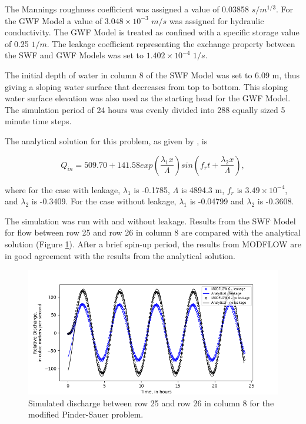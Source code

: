 \documentclass[fleqn]{article}
\begin{document}
The Mannings roughness coefficient was assigned a value of 0.03858 $s/m^{1/3}$.  For the GWF Model a value of $3.048 \times 10^{-3}$ $m/s$ was assigned for hydraulic conductivity. The GWF Model is treated as confined with a specific storage value of 0.25 $1/m$.  The leakage coefficient representing the exchange property between the SWF and GWF Models was set to $1.402 \times 10^{-4}$ $1/s$.

The initial depth of water in column 8 of the SWF Model was set to 6.09 m, thus giving a sloping water surface that decreases from top to bottom.  This sloping water surface elevation was also used as the starting head for the GWF Model.  The simulation period of 24 hours was evenly divided into 288 equally sized 5 minute time steps.  

The analytical solution for this problem, as given by \cite{lal2001}, is

\begin{equation}
  Q_{in} = 509.70 + 141.58 
  exp \left ( \frac{\lambda_1 x}{\Lambda} \right ) 
  sin \left ( f_r t + \frac{\lambda_2 x}{\Lambda}\right ),
\end{equation}

\noindent where for the case with leakage, $\lambda_1$ is -0.1785, $\Lambda$ is 4894.3 m, $f_r$ is $3.49 \times 10^{-4}$, and $\lambda_2$ is -0.3409.  For the case without leakage, $\lambda_1$ is -0.04799 and $\lambda_2$ is -0.3608.

The simulation was run with and without leakage.  Results from the SWF Model for flow between row 25 and row 26 in column 8 are compared with the analytical solution (Figure \ref{fig:pinder-sauer}). After a brief spin-up period, the results from MODFLOW are in good agreement with the results from the analytical solution.

\begin{figure}
	\centering
	\includegraphics[scale=0.50]{figures/pinder-sauer-results.png}
	\caption[Simulated discharge between row 25 and row 26 in column 8 for the modified Pinder-Sauer problem.]{Simulated discharge between row 25 and row 26 in column 8 for the modified Pinder-Sauer problem.}
	\label{fig:pinder-sauer}
\end{figure}
\end{document}
